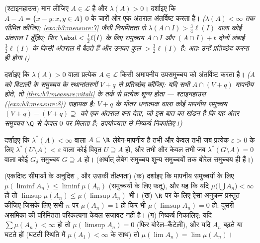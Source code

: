 \begin{exercise}[$\star\star\star$]\label{exo:b3:measure:8}
(श्टाइनहाउस) मान लीजिए $A \in \mathcal L$ है और $\lambda(A) > 0$। दर्शाइए कि $A - A = \{x - y : x, y \in A\}$ $0$
के चारों ओर एक अंतराल अंतर्विष्ट करता है। \emph{($\lambda(A) < \infty$ तक सीमित
कीजिए; \cref{exo:b3:measure:7} जैसी नियमितता से $\lambda(A \cap I) > \frac34\ell(I)$ वाला कोई अंतराल $I$
ढूँढ़िए; फिर $\abs t <
\frac12\ell(I)$ के लिए समुच्चय $A\cap I$ और $(A\cap I) + t$ दोनों लंबाई
$\frac32\ell(I)$ के किसी अंतराल में बैठते हैं और उनका कुल  $> \frac32\ell(I)$ है: अतः
उन्हें प्रतिच्छेद करना ही होगा।)}
\end{exercise}

\begin{exercise}[$\star\star\star$]\label{exo:b3:measure:9}
दर्शाइए कि $\lambda(A) > 0$ वाला प्रत्येक $A \in \mathcal L$ किसी अमापनीय उपसमुच्चय को
अंतर्विष्ट करता है। \emph{($A$ को विटाली के समुच्चय के
स्थानांतरणों $V + q$ से प्रतिच्छेद कीजिए: यदि सभी $A \cap (V+q)$ मापनीय
होते, तो \cref{thm:b3:measure:vitali} के तर्क से प्रत्येक शून्य होता --- श्टाइनहाउस
(\cref{exo:b3:measure:8}) सहायक है: $V + q$ के भीतर धनात्मक  वाला कोई मापनीय
समुच्चय $(V+q) - (V+q) \supseteq$ को एक अंतराल बना देता, जो इस बात का खंडन है कि यह
अंतर समुच्चय $\Q$ से केवल $0$ पर मिलता है; उपयोज्यता से
निष्कर्ष निकालिए।)}
\end{exercise}

\begin{exercise}[$\star\star$]\label{exo:b3:measure:10}
दर्शाइए कि $\lambda^*(A) < \infty$ वाला $A \subseteq \R$ लेबेग-मापनीय है तभी और केवल तभी जब
प्रत्येक $\varepsilon > 0$ के लिए $\lambda^*(U \setminus A) <
\varepsilon$ वाला कोई विवृत $U \supseteq A$ हो, और तभी और
केवल तभी जब $\lambda^*(G\setminus A) = 0$ वाला कोई $G_\delta$ समुच्चय $G \supseteq A$ हो। (अर्थात् लेबेग
समुच्चय शून्य समुच्चयों तक बोरेल समुच्चय ही हैं।)
\end{exercise}

\begin{exercise}[$\star\star$]\label{exo:b3:measure:11}
(एकदिष्ट सीमाओं के अनुदिश , और उसकी तीक्ष्णता)
(क) दर्शाइए कि मापनीय समुच्चयों के लिए $\mu(\liminf A_n) \leq
\liminf\mu(A_n)$ (समुच्चयों के लिए
फतू), और यह कि यदि $\mu\bigl(\bigcup A_n\bigr) < \infty$ हो तो $\limsup\mu(A_n) \leq \mu(\limsup A_n)$ भी।
(ख) $\R$ पर  के लिए ऐसा अनुक्रम प्रस्तुत कीजिए जिसके
लिए सभी $n$ पर $\mu(A_n) = 1$ हो फिर भी $\mu(\limsup A_n) = 0$ हो: दूसरी असमिका की
परिमितता परिकल्पना केवल सजावट नहीं है।
(ग) निष्कर्ष निकालिए: यदि $\sum\mu(A_n) < \infty$ हो तो $\mu(\limsup A_n) = 0$ (फिर बोरेल--कैंटेली),
और यदि $A_n$ बढ़ते या घटते हों (घटती स्थिति में $\mu(A_1) < \infty$ के साथ) तो
$\mu(\lim A_n) = \lim\mu(A_n)$।
\end{exercise}

